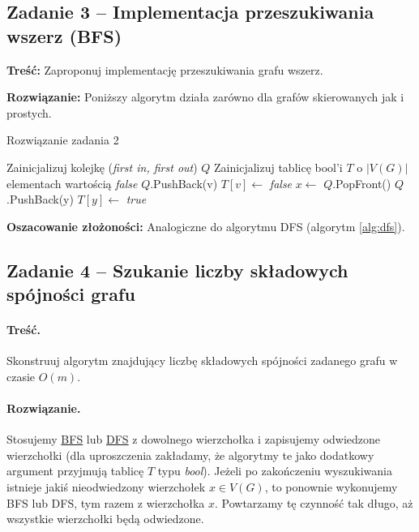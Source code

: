 \subsection{Zadanie 3 -- Implementacja przeszukiwania wszerz (BFS)}

\textbf{Treść: } Zaproponuj implementację
przeszukiwania grafu wszerz.

\textbf{Rozwiązanie:}
Poniższy algorytm działa zarówno dla grafów skierowanych
jak i prostych.

\begin{algorithm}[H]
	\caption{Rozwiązanie zadania 2}\label{Zadanie23}
	\begin{algorithmic}[1]
		\State Zainicjalizuj kolejkę (\textit{first in, first out}) $Q$
		\State Zainicjalizuj tablicę bool'i $T$ o $|V(G)|$ elementach wartością 
		\textit{false}
		\State $Q$.PushBack(v)
		\State $T[v] \gets$ \textit{false}
		\State $x \gets$ $Q$.PopFront()
		\State $Q$.PushBack(y)
		\State $T[y] \gets$ \textit{true} 
		\EndIf
		\EndWhile
		\EndWhile
		\EndProcedure
	\end{algorithmic}
\end{algorithm}

\textbf{Oszacowanie złożoności:} Analogiczne do algorytmu DFS (algorytm \ref{alg:dfs}).

\subsection{Zadanie 4 -- Szukanie liczby składowych spójności grafu}
\paragraph{Treść.} Skonstruuj algorytm znajdujący liczbę składowych 
spójności zadanego grafu w czasie $O(m)$.

\paragraph{Rozwiązanie.} Stosujemy \hyperref[Zadanie23]{BFS} lub \hyperref[Zadanie22a]{DFS} z dowolnego wierzchołka i zapisujemy odwiedzone wierzchołki (dla uproszczenia zakładamy, że algorytmy te jako dodatkowy argument przyjmują tablicę $T$ typu \textit{bool}). Jeżeli po zakończeniu wyszukiwania istnieje jakiś nieodwiedzony wierzchołek $x \in V(G)$, to ponownie wykonujemy BFS lub DFS, tym razem z wierzchołka $x$. Powtarzamy tę czynność tak długo, aż wszystkie wierzchołki będą odwiedzone. 

